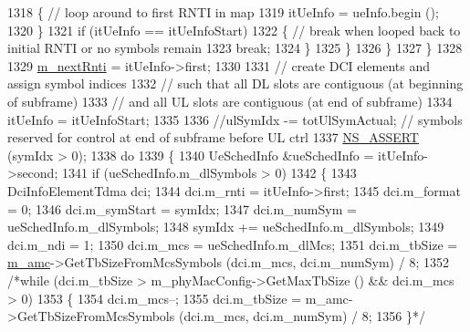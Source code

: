 \begin{DoxyCode}
1318                                 \{ \textcolor{comment}{// loop around to first RNTI in map}
1319                                         itUeInfo = ueInfo.begin ();
1320                                 \}
1321                                 \textcolor{keywordflow}{if} (itUeInfo == itUeInfoStart)
1322                                 \{ \textcolor{comment}{// break when looped back to initial RNTI or no symbols remain}
1323                                         \textcolor{keywordflow}{break};
1324                                 \}
1325                         \}
1326                 \}
1327         \}
1328 
1329         \hyperlink{classns3_1_1MmWaveFlexTtiMacScheduler_a447f8e61dd792d50e334f6406caf1530}{m\_nextRnti} = itUeInfo->first;
1330 
1331         \textcolor{comment}{// create DCI elements and assign symbol indices}
1332         \textcolor{comment}{// such that all DL slots are contiguous (at beginning of subframe)}
1333         \textcolor{comment}{// and all UL slots are contiguous (at end of subframe)}
1334         itUeInfo = itUeInfoStart;
1335 
1336         \textcolor{comment}{//ulSymIdx -= totUlSymActual; // symbols reserved for control at end of subframe before UL ctrl}
1337         \hyperlink{assert_8h_a6dccdb0de9b252f60088ce281c49d052}{NS\_ASSERT} (symIdx > 0);
1338         \textcolor{keywordflow}{do}
1339         \{
1340                 UeSchedInfo &ueSchedInfo = itUeInfo->second;
1341                 \textcolor{keywordflow}{if} (ueSchedInfo.m\_dlSymbols > 0)
1342                 \{
1343                         DciInfoElementTdma dci;
1344                         dci.m\_rnti = itUeInfo->first;
1345                         dci.m\_format = 0;
1346                         dci.m\_symStart = symIdx;
1347                         dci.m\_numSym = ueSchedInfo.m\_dlSymbols;
1348                         symIdx += ueSchedInfo.m\_dlSymbols;
1349                         dci.m\_ndi = 1;
1350                         dci.m\_mcs = ueSchedInfo.m\_dlMcs;
1351                         dci.m\_tbSize = \hyperlink{classns3_1_1MmWaveFlexTtiMacScheduler_a80d0b9fd279dd5c33c52cf0833d264da}{m\_amc}->GetTbSizeFromMcsSymbols (dci.m\_mcs, dci.m\_numSym) / 8;
1352                         \textcolor{comment}{/*while (dci.m\_tbSize > m\_phyMacConfig->GetMaxTbSize () && dci.m\_mcs > 0)}
1353 \textcolor{comment}{                        \{}
1354 \textcolor{comment}{                                dci.m\_mcs--;}
1355 \textcolor{comment}{                                dci.m\_tbSize = m\_amc->GetTbSizeFromMcsSymbols (dci.m\_mcs, dci.m\_numSym) /
       8;}
1356 \textcolor{comment}{                        \}*/}

\end{DoxyCode}
